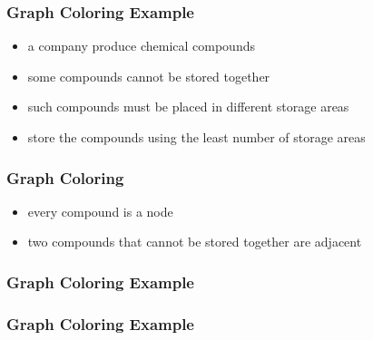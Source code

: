\documentclass[dvipsnames]{beamer}
\begin{document}
\begin{frame}
  \frametitle{Graph Coloring Example}

  \begin{example}
    \begin{itemize}
      \item a company produce chemical compounds
      \item some compounds cannot be stored together
      \item such compounds must be placed in different storage areas

      \pause
      \medskip
      \item store the compounds using the least number of storage areas
    \end{itemize}
  \end{example}
\end{frame}

\begin{frame}
  \frametitle{Graph Coloring}

  \begin{example}
    \begin{itemize}
      \item every compound is a node
      \item two compounds that cannot be stored together are adjacent
    \end{itemize}

    \begin{center}
    \end{center}
  \end{example}
\end{frame}

\begin{frame}
  \frametitle{Graph Coloring Example}

  \begin{example}
    \begin{center}
    \end{center}
  \end{example}
\end{frame}

\begin{frame}
  \frametitle{Graph Coloring Example}

  \begin{example}
    \begin{columns}
      \begin{center}
      \end{center}

      \begin{center}
      \end{center}
    \end{columns}
  \end{example}
\end{frame}
\end{document}

